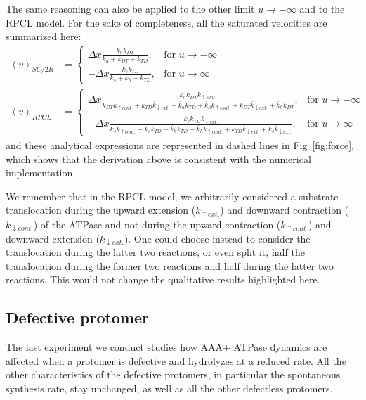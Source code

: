     The same reasoning can also be applied to the other limit $u\rightarrow -\infty$ and to the RPCL model. For the sake of completeness, all the saturated velocities are summarized here:
    \begin{equation}
    \begin{split}
        \left\langle v \right\rangle_{SC/2R} &=
            \begin{cases}
                \Delta x \frac{k_h k_{DT}}{k_h + k_{DT} + k_{TD}},
                    & \text{for } u\rightarrow -\infty \\
                - \Delta x \frac{k_s k_{TD}}{k_s + k_h + k_{TD}},
                    & \text{for } u\rightarrow \infty
            \end{cases} \\
        \left\langle v \right\rangle_{RPCL} &= 
            \begin{cases}
                \Delta x \frac{\bar{k}_h k_{DT} k_{\uparrow cont.}}{k_{DT} k_{\uparrow cont.} + k_{TD} \bar{k}_{\downarrow ext.} + \bar{k}_h k_{TD} + \bar{k}_h k_{\uparrow cont.} + k_{DT} \bar{k}_{\downarrow ext.} + \bar{k}_h k_{DT}}, 
                    & \text{for } u\rightarrow -\infty \\
                - \Delta x \frac{k_s k_{TD} \bar{k}_{\downarrow ext.}}{k_s k_{\uparrow cont.} + k_s k_{TD} + \bar{k}_h k_{TD} + \bar{k}_h k_{\uparrow cont.} + k_{TD} \bar{k}_{\downarrow ext.} + k_s \bar{k}_{\downarrow ext.}},
                    & \text{for } u\rightarrow \infty
            \end{cases}
    \end{split}
    \end{equation}
    and these analytical expressions are represented in dashed lines in Fig~\ref{fig:force}, which shows that the derivation above is consistent with the numerical implementation.
    
    We remember that in the RPCL model, we arbitrarily considered a substrate translocation during the upward extension ($k_{\uparrow ext.}$) and downward contraction ($k_{\downarrow cont.}$) of the ATPase and not during the upward contraction ($k_{\uparrow cont.}$) and downward extension ($k_{\downarrow ext.}$). One could choose instead to consider the translocation during the latter two reactions, or even split it, half the translocation during the former two reactions and half during the latter two reactions. This would not change the qualitative results highlighted here.

\subsection{Defective protomer}
    The last experiment we conduct studies how AAA+ ATPase dynamics are affected when a protomer is defective and hydrolyzes at a reduced rate. All the other characteristics of the defective protomers, in particular the spontaneous synthesis rate, stay unchanged, as well as all the other defectless protomers. 

